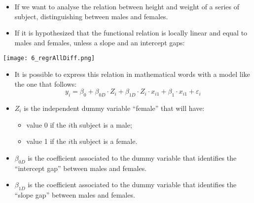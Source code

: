 
\begin{frame}
  \begin{itemize}
    \item If we want to analyse the relation between height and weight of a series of subject, distinguishing between males and females. 
    \item If it is hypothesized that the functional relation is locally linear and equal to males and females, unless a slope and an intercept gaps:
  \end{itemize}
  \begin{center}
    \texttt{[image: 6\_regrAllDiff.png]}
  \end{center}
\end{frame}

\begin{frame}
  \vspace*{.25cm}
  \begin{itemize}
    \item It is possible to express this relation in mathematical words with a model like the one that follows:
      \vspace{-0.3cm} $$ y_i = \beta_0 + \beta_{0D} \cdot Z_i + \beta_{1D} \cdot Z_i \cdot x_{i1} + \beta_1 \cdot x_{i1} + \varepsilon_i $$ 
    \item $Z_i$ is the independent dummy variable ``female'' that will have:
    \begin{itemize}
      \item value 0 if the $i$th subject is a male;
      \item value 1 if the $i$th subject is a female.
    \end{itemize}
    \vspace{0.2cm}\item $ \beta_{0D} $ is the coefficient associated to the dummy variable that identifies the ``intercept gap'' between males and females.
    \item $ \beta_{1D} $ is the coefficient associated to the dummy variable that identifies the ``slope gap'' between males and females.
  \end{itemize}
\end{frame}

